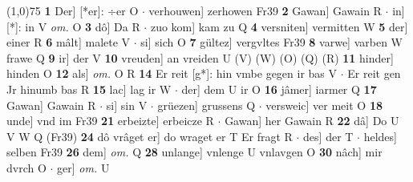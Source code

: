 \documentclass[8pt,a4paper,notitlepage]{article}
\begin{document}
\begin{table}[ht]
\begin{minipage}[t]{0.5\linewidth}
\line(1,0){75} \newline
\textbf{1} Der] [*er]: ÷er O  $\cdot$ verhouwen] zerhowen Fr39 \textbf{2} Gawan] Gawain R  $\cdot$ in] [*]: in V \textit{om.} O \textbf{3} dô] Da R  $\cdot$ zuo kom] kam zu Q \textbf{4} versniten] vermitten W \textbf{5} der] einer R \textbf{6} mâlt] malete V  $\cdot$ si] sich O \textbf{7} gültez] vergvltes Fr39 \textbf{8} varwe] varben W frawe Q \textbf{9} ir] der V \textbf{10} vreuden] an vreiden U (V) (W) (O) (Q) (R) \textbf{11} hinder] hinden O \textbf{12} als] \textit{om.} O R \textbf{14} Er reit [g*]: hin vmbe gegen ir bas V  $\cdot$ Er reit gen Jr hinumb bas R \textbf{15} lac] lag ir W  $\cdot$ der] dem U ir O \textbf{16} jâmer] iarmer Q \textbf{17} Gawan] Gawain R  $\cdot$ si] sin V  $\cdot$ grüezen] grussens Q  $\cdot$ versweic] ver meit O \textbf{18} unde] vnd im Fr39 \textbf{21} erbeizte] erbeicze R  $\cdot$ Gawan] her Gawain R \textbf{22} dâ] Do U V W Q (Fr39) \textbf{24} dô vrâget er] do wraget er T Er fragt R  $\cdot$ des] der T  $\cdot$ heldes] selben Fr39 \textbf{26} dem] \textit{om.} Q \textbf{28} unlange] vnlenge U vnlavgen O \textbf{30} nâch] mir dvrch O  $\cdot$ ger] \textit{om.} U \newline
\end{minipage}
\end{table}
\end{document}
